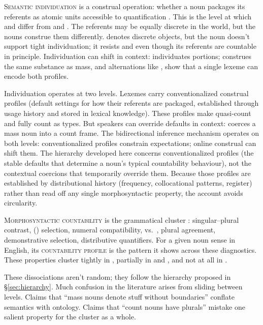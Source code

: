\documentclass[12pt,a4paper]{article}
\begin{document}
\textsc{Semantic individuation} is a construal operation: whether a noun packages its referents as atomic units accessible to quantification \citep{chierchia1998,rothstein2010,grimm2018}. This is the level at which  and  differ from  and . The referents may be equally discrete in the world, but the nouns construe them differently.  denotes discrete objects, but the noun doesn't support tight individuation; it resists  and  even though its referents are countable in principle. Individuation can shift in context:  individuates portions;  construes the same substance as mass, and alternations like ,  show that a single lexeme can encode both profiles.

Individuation operates at two levels. Lexemes carry conventionalized construal profiles (default settings for how their referents are packaged, established through usage history and stored in lexical knowledge). These profiles make  quasi-count and  fully count as types. But speakers can override defaults in context:  coerces a mass noun into a count frame. The bidirectional inference mechanism operates on both levels: conventionalized profiles constrain expectations; online construal can shift them. The hierarchy developed here concerns conventionalized profiles (the stable defaults that determine a noun's typical countability behaviour), not the contextual coercions that temporarily override them. Because those profiles are established by distributional history (frequency, collocational patterns, register) rather than read off any single morphosyntactic property, the account avoids circularity.

\textsc{Morphosyntactic countability} is the grammatical cluster \citep[pp.~333--336]{huddleston2002,allan1980}: singular--plural contrast, () selection, numeral compatibility,  vs.\ , plural agreement, demonstrative selection, distributive quantifiers. For a given noun sense in English, its \textsc{countability profile} is the pattern it shows across these diagnostics. These properties cluster tightly in , partially in  and , and not at all in .

These dissociations aren't random; they follow the hierarchy proposed in \S\ref{sec:hierarchy}. Much confusion in the literature arises from sliding between levels. Claims that \enquote{mass nouns denote stuff without boundaries} conflate semantics with ontology. Claims that \enquote{count nouns have plurals} mistake one salient property for the cluster as a whole.
\end{document}
